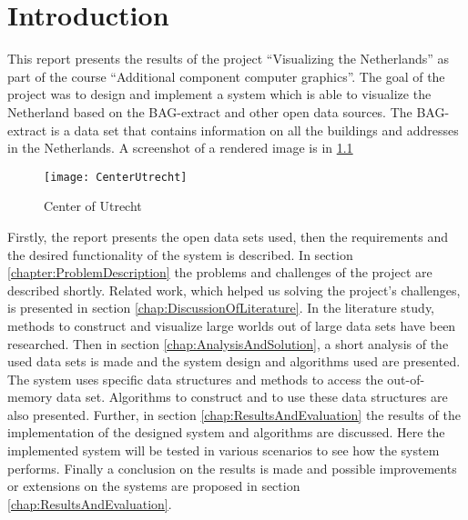 \chapter{Introduction}
\label{chap:Introduction}
This report presents the results of the project “Visualizing the Netherlands” as part of the course “Additional component computer graphics”. The goal of the project was to design and implement a system which is able to visualize the Netherland based on the BAG-extract \cite{BAG14} and other open data sources. The BAG-extract is a data set that contains information on all the buildings and addresses in the Netherlands. A screenshot of a rendered image is in \ref{fig:utrechtCenter}

\begin{figure}[htb!]
\centering
\texttt{[image: CenterUtrecht]}
\caption{Center of Utrecht}
\label{fig:utrechtCenter}
\end{figure}

Firstly, the report presents the open data sets used, then the requirements and the desired functionality of the system is described. In section \ref{chapter:ProblemDescription} the problems and challenges of the project are described shortly. Related work, which helped us solving the project’s challenges, is presented in section \ref{chap:DiscussionOfLiterature}. In the literature study, methods to construct and visualize large worlds out of large data sets have been researched. Then in section \ref{chap:AnalysisAndSolution}, a short analysis of the used data sets is made and the system design and algorithms used are presented. The system uses specific data structures and methods to access the out-of-memory data set. Algorithms to construct and to use these data structures are also presented. Further, in section \ref{chap:ResultsAndEvaluation} the results of the implementation of the designed system and algorithms are discussed. Here the implemented system will be tested in various scenarios to see how the system performs. Finally a conclusion on the results is made and possible improvements or extensions on the systems are proposed in section \ref{chap:ResultsAndEvaluation}.

